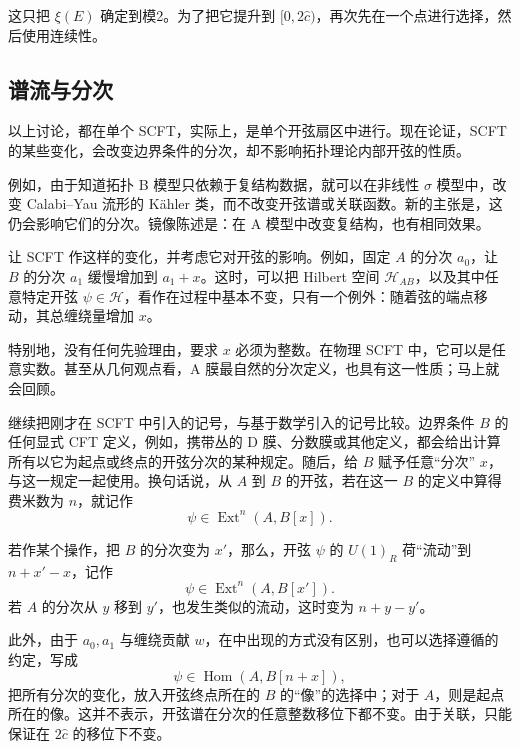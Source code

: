 这只把 $\xi(E)$ 确定到模2。为了把它提升到 $[0,2\hat c)$，再次先在一个点进行选择，然后使用连续性。

\subsection{谱流与分次}\label{sec:5.3.6}

以上讨论，都在单个 SCFT，实际上，是单个开弦扇区中进行。现在论证，SCFT 的某些变化，会改变边界条件的分次，却不影响拓扑理论内部开弦的性质。

例如，由于知道拓扑 B 模型只依赖于复结构数据，就可以在非线性 $\sigma$ 模型中，改变 Calabi--Yau 流形的 K\"ahler 类，而不改变开弦谱或关联函数。新的主张是，这仍会影响它们的分次。镜像陈述是：在 A 模型中改变复结构，也有相同效果。

让 SCFT 作这样的变化，并考虑它对开弦的影响。例如，固定 $A$ 的分次 $a_0$，让 $B$ 的分次 $a_1$ 缓慢增加到 $a_1+x$。这时，可以把 Hilbert 空间 $\mathcal{H}_{AB}$，以及其中任意特定开弦 $\psi\in\mathcal{H}$，看作在过程中基本不变，只有一个例外：随着弦的端点移动，其总缠绕量增加 $x$。

特别地，没有任何先验理由，要求 $x$ 必须为整数。在物理 SCFT 中，它可以是任意实数。甚至从几何观点看，A 膜最自然的分次定义，也具有这一性质；马上就会回顾。

继续把刚才在 SCFT 中引入的记号，与基于数学引入的记号比较。边界条件 $B$ 的任何显式 CFT 定义，例如，携带丛的 D 膜、分数膜或其他定义，都会给出计算所有以它为起点或终点的开弦分次的某种规定。随后，给 $B$ 赋予任意“分次” $x$，与这一规定一起使用。换句话说，从 $A$ 到 $B$ 的开弦，若在这一 $B$ 的定义中算得费米数为 $n$，就记作
\[
\psi\in\operatorname{Ext}^n(A,B[x]).
\]

若作某个操作，把 $B$ 的分次变为 $x'$，那么，开弦 $\psi$ 的 $U(1)_R$ 荷“流动”到 $n+x'-x$，记作
\[
\psi\in\operatorname{Ext}^n(A,B[x']).
\]
若 $A$ 的分次从 $y$ 移到 $y'$，也发生类似的流动，这时变为 $n+y-y'$。

此外，由于 $a_0,a_1$ 与缠绕贡献 $w$，在中出现的方式没有区别，也可以选择遵循的约定，写成
\[
\psi\in\operatorname{Hom}(A,B[n+x]),
\]
把所有分次的变化，放入开弦终点所在的 $B$ 的“像”的选择中；对于 $A$，则是起点所在的像。这并不表示，开弦谱在分次的任意整数移位下都不变。由于关联，只能保证在 $2\hat c$ 的移位下不变。

